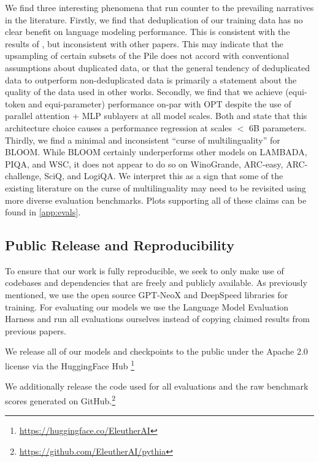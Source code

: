 We find three interesting phenomena that run counter to the prevailing narratives in the literature. Firstly, we find that deduplication of our training data has no clear benefit on language modeling performance. This is consistent with the results of \citet{black2022gpt}, but inconsistent with other papers. This may indicate that the upsampling of certain subsets of the Pile does not accord with conventional assumptions about duplicated data, or that the general tendency of deduplicated data to outperform non-deduplicated data is primarily a statement about the quality of the data used in other works. Secondly, we find that we achieve (equi-token and equi-parameter) performance on-par with OPT despite the use of parallel attention + MLP sublayers at all model scales. Both \citet{black2022gpt} and \citet{chowdhery2022palm} state that this architecture choice causes a performance regression at scales $<$ 6B parameters. Thirdly, we find a minimal and inconsistent ``curse of multilinguality'' \citep{goyal2020unsupervised,pfeiffer2022lifting} for BLOOM. While BLOOM certainly underperforms other models on LAMBADA, PIQA, and WSC, it does not appear to do so on WinoGrande, ARC-easy, ARC-challenge, SciQ, and LogiQA. We interpret this as a sign that some of the existing literature on the curse of multilinguality may need to be revisited using more diverse evaluation benchmarks. Plots supporting all of these claims can be found in \ref{app:evals}.

\subsection{Public Release and Reproducibility}

To ensure that our work is fully reproducible, we seek to only make use of codebases and dependencies that are freely and publicly available. As previously mentioned, we use the open source GPT-NeoX and DeepSpeed libraries for training. For evaluating our models we use the Language Model Evaluation Harness \citep{gao2021eval} and run all evaluations ourselves instead of copying claimed results from previous papers.

We release all of our models and checkpoints to the public under the Apache 2.0 license via the HuggingFace Hub \citep{wolf2019huggingface}\footnote{\url{https://huggingface.co/EleutherAI}}

We additionally release the code used for all evaluations and the raw benchmark scores generated on GitHub.\footnote{\url{https://github.com/EleutherAI/pythia}}

